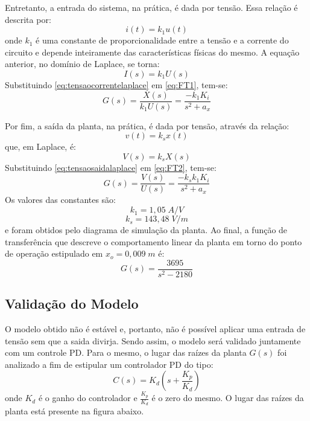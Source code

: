 \documentclass{ifacconf}
\begin{document}
Entretanto, a entrada do sistema, na prática, é dada por tensão. Essa relação é descrita por:
\begin{equation}
    i(t) = k_1u(t)
\end{equation}
\noindent onde $k_1$ é uma constante de proporcionalidade entre a tensão e a corrente do circuito e depende inteiramente das características físicas do mesmo. A equação anterior, no domínio de Laplace, se torna:
\begin{equation}
    I(s) = k_1U(s)
    \label{eq:tensaocorrentelaplace}
\end{equation}
Substituindo \ref{eq:tensaocorrentelaplace} em \ref{eq:FT1}, tem-se:
\begin{equation}
    G(s) = \frac{X(s)}{k_1U(s)} = \frac{-k_1K_i}{s^2+a_x}
    \label{eq:FT2}
\end{equation}

Por fim, a saída da planta, na prática, é dada por tensão, através da relação:
\begin{equation}
    v(t) = k_sx(t)
\end{equation}
que, em Laplace, é:
\begin{equation}
    V(s) = k_sX(s)
    \label{eq:tensaosaidalaplace}
\end{equation}
Substituindo \ref{eq:tensaosaidalaplace} em \ref{eq:FT2}, tem-se:
\begin{equation}
    G(s) = \frac{V(s)}{U(s)} = \frac{-k_sk_1K_i}{s^2+a_x}
\end{equation}
Os valores das constantes são:
\begin{equation}
    k_1 = 1,05\; A/V
\end{equation}
\begin{equation}
    k_s = 143,48\; V/m
\end{equation}
\noindent e foram obtidos pelo diagrama de simulação da planta.
Ao final, a função de transferência que descreve o comportamento linear da planta em torno do ponto de operação estipulado em $x_o = 0,009\;m$ é:
\begin{equation}
    G(s) = \frac{3695}{s^2 - 2180}
    \label{eq:FTFINAL}
\end{equation}

\subsection{Validação do Modelo}
O modelo obtido não é estável e, portanto, não é possível aplicar uma entrada de tensão sem que a saida divirja. Sendo assim, o modelo será validado juntamente com um controle PD. Para o mesmo, o lugar das raízes da planta $G(s)$ foi analizado a fim de estipular um controlador PD do tipo:
\begin{equation}
    C(s) = K_d(s+\frac{K_p}{K_d})
\end{equation}
\noindent onde $K_d$ é o ganho do controlador e $\frac{K_p}{K_d}$ é o zero do mesmo. O lugar das raízes da planta está presente na figura abaixo.
\end{document}
